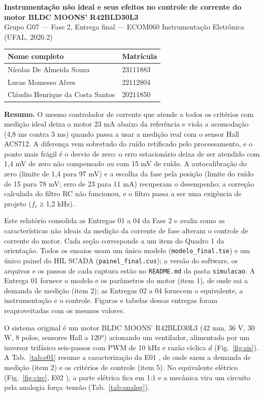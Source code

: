 \documentclass[10pt,a4paper]{article}
\newcommand{\R}[1]{\FloatBarrier\par\medskip\noindent{\large\bfseries #1}\par\smallskip}
\begin{document}
\begin{center}
{\Large\bfseries Instrumentação não ideal e seus efeitos no controle de corrente do motor BLDC MOONS' R42BLD30L3}\\[2pt]
Grupo G07 — Fase 2, Entrega final — ECOM060 Instrumentação Eletrônica (UFAL, 2026.2)\\[4pt]
\begin{tabular}{ll}\toprule Nome completo & Matrícula\\\midrule
Nícolas De Almeida Souza & 23111883\\ Lucas Momesso Alves & 22112804\\ Cláudio Henrique da Costa Santos & 20211850\\\bottomrule\end{tabular}
\end{center}

\noindent\textbf{Resumo.} O mesmo controlador de corrente que atende a todos os critérios com medição ideal deixa o motor 23 mA abaixo da referência e viola a acomodação (4,8 ms contra 3 ms) quando passa a usar a medição real com o sensor Hall ACS712. A diferença vem sobretudo do ruído retificado pelo processamento, e o ponto mais frágil é o desvio de zero: o erro estacionário deixa de ser atendido com 1,4 mV de zero não compensado ou com 15 mV de ruído. A autocalibração do zero (limite de 1,4 para 97 mV) e a escolha da fase pela posição (limite do ruído de 15 para 78 mV; erro de 23 para 11 mA) recuperam o desempenho; a correção calculada do filtro RC não funcionou, e o filtro passa a ser uma exigência de projeto ($f_c$ ≥ 1,2 kHz).

\noindent Este relatório consolida as Entregas 01 a 04 da Fase 2 e avalia como as características não ideais da medição da corrente de fase alteram o controle de corrente do motor. Cada seção corresponde a um item do Quadro 1 da orientação. Todos os ensaios usam um único modelo (\texttt{modelo\_final.tse}) e um único painel do HIL SCADA (\texttt{painel\_final.cus}); a versão do software, os arquivos e os passos de cada captura estão no \texttt{README.md} da pasta \texttt{simulacao}. A Entrega 01 \cite{e01} fornece o modelo e os parâmetros do motor (item 1), de onde sai a demanda de medição (item 2); as Entregas 02 a 04 \cite{e02,e03,e04} fornecem o equivalente, a instrumentação e o controle. Figuras e tabelas dessas entregas foram reaproveitadas com os mesmos valores.

\R{1. Sistema e equivalente}
O sistema original é um motor BLDC MOONS' R42BLD30L3 \cite{moons} (42 mm, 36 V, 30 W, 8 polos, sensores Hall a 120°) acionando um ventilador, alimentado por um inversor trifásico seis-passos com PWM de 10 kHz e razão cíclica $d$ (Fig.~\ref{fig:sis}). A Tab.~\ref{tab:e01} resume a caracterização da E01 \cite{e01}, de onde saem a demanda de medição (item 2) e os critérios de controle (item 5). No equivalente elétrico (Fig.~\ref{fig:circ}, E02 \cite{e02}), a parte elétrica fica em 1:1 e a mecânica vira um circuito pela analogia força–tensão (Tab.~\ref{tab:analog}).
\end{document}
